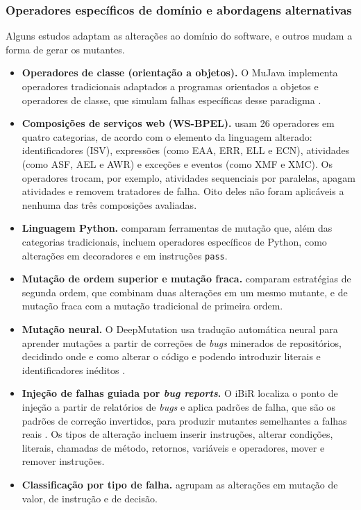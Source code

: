 \subsubsection{Operadores específicos de domínio e abordagens alternativas}

Alguns estudos adaptam as alterações ao domínio do software, e outros mudam a forma de gerar os mutantes.

\begin{itemize}
    \item \textbf{Operadores de classe (orientação a objetos).} O MuJava implementa operadores tradicionais adaptados a programas orientados a objetos e operadores de classe, que simulam falhas específicas desse paradigma \cite{chauhan2015, nica2011}.
    
    \item \textbf{Composições de serviços web (WS-BPEL).}  usam 26 operadores em quatro categorias, de acordo com o elemento da linguagem alterado: identificadores (ISV), expressões (como EAA, ERR, ELL e ECN), atividades (como ASF, AEL e AWR) e exceções e eventos (como XMF e XMC). Os operadores trocam, por exemplo, atividades sequenciais por paralelas, apagam atividades e removem tratadores de falha. Oito deles não foram aplicáveis a nenhuma das três composições avaliadas.
    
    \item \textbf{Linguagem Python.}  comparam ferramentas de mutação que, além das categorias tradicionais, incluem operadores específicos de Python, como alterações em decoradores e em instruções \texttt{pass}.
    
    \item \textbf{Mutação de ordem superior e mutação fraca.}  comparam estratégias de segunda ordem, que combinam duas alterações em um mesmo mutante, e de mutação fraca com a mutação tradicional de primeira ordem.
    
    \item \textbf{Mutação neural.} O DeepMutation usa tradução automática neural para aprender mutações a partir de correções de \textit{bugs} minerados de repositórios, decidindo onde e como alterar o código e podendo introduzir literais e identificadores inéditos \cite{tufano2020}.
    
    \item \textbf{Injeção de falhas guiada por \textit{bug reports}.} O iBiR localiza o ponto de injeção a partir de relatórios de \textit{bugs} e aplica padrões de falha, que são os padrões de correção invertidos, para produzir mutantes semelhantes a falhas reais \cite{khanfir2023}. Os tipos de alteração incluem inserir instruções, alterar condições, literais, chamadas de método, retornos, variáveis e operadores, mover e remover instruções.
    
    \item \textbf{Classificação por tipo de falha.}  agrupam as alterações em mutação de valor, de instrução e de decisão.
\end{itemize}

